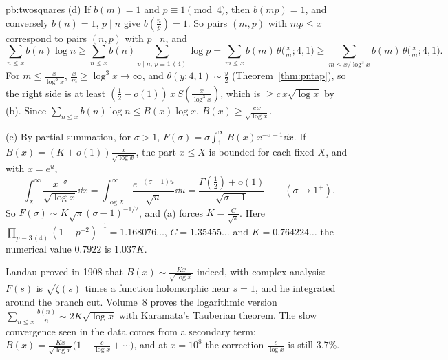 \begin{solution}{pb:twosquares}
(d) If $b(m)=1$ and $p\equiv1\pmod4$, then $b(mp)=1$, and conversely $b(n)=1$, $p\mid n$ give $b(\frac np)=1$. So pairs $(m,p)$ with $mp\le x$ correspond to pairs $(n,p)$ with $p\mid n$, and
\[
\sum_{n\le x}b(n)\log n\ge\sum_{n\le x}b(n)\sum_{p\mid n,\,p\equiv1\,(4)}\log p=\sum_{m\le x}b(m)\,\theta\bigl(\tfrac xm;4,1\bigr)\ge\sum_{m\le x/\log^3x}b(m)\,\theta\bigl(\tfrac xm;4,1\bigr).
\]
For $m\le\frac x{\log^3x}$, $\frac xm\ge\log^3x\to\infty$, and $\theta(y;4,1)\sim\frac y2$ (Theorem~\ref{thm:pntap}), so the right side is at least $(\frac12-o(1))\,x\,S(\frac x{\log^3x})$, which
is $\ge c\,x\sqrt{\log x}$ by (b). Since $\sum_{n\le x}b(n)\log n\le B(x)\log x$, $B(x)\ge\frac{c\,x}{\sqrt{\log x}}$.

(e) By partial summation, for $\sigma>1$, $F(\sigma)=\sigma\int_1^\infty B(x)x^{-\sigma-1}\dd x$. If $B(x)=(K+o(1))\frac x{\sqrt{\log x}}$, the part $x\le X$ is bounded for each fixed $X$, and
with $x=e^u$,
\[
\int_X^\infty\frac{x^{-\sigma}}{\sqrt{\log x}}\dd x=\int_{\log X}^\infty\frac{e^{-(\sigma-1)u}}{\sqrt u}\dd u=\frac{\Gamma(\frac12)+o(1)}{\sqrt{\sigma-1}}\qquad(\sigma\to1^+).
\]
So $F(\sigma)\sim K\sqrt\pi(\sigma-1)^{-1/2}$, and (a) forces $K=\frac C{\sqrt\pi}$. Here $\prod_{p\equiv3\,(4)}(1-p^{-2})^{-1}=1.168076\ldots$, $C=1.35455\ldots$ and $K=0.764224\ldots$
the numerical value $0.7922$ is $1.037K$.


\leads Landau proved in 1908 that $B(x)\sim\frac{Kx}{\sqrt{\log x}}$ indeed, with complex analysis: $F(s)$ is $\sqrt{\zeta(s)}$ times a function holomorphic near $s=1$, and he integrated
around the branch cut. Volume~8 proves the logarithmic version $\sum_{n\le x}\frac{b(n)}n\sim2K\sqrt{\log x}$ with Karamata's Tauberian theorem. The slow convergence seen in the
data comes from a secondary term: $B(x)=\frac{Kx}{\sqrt{\log x}}\bigl(1+\frac{c}{\log x}+\cdots\bigr)$, and at $x=10^8$ the correction $\frac c{\log x}$ is still $3.7\%$.
\end{solution}

